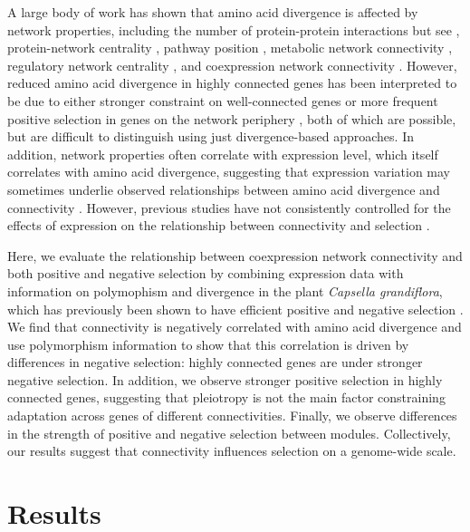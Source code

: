 A large body of work has shown that amino acid divergence is affected by network properties, including the number of protein-protein interactions \citep{Fraser2002-rg,Lemos2005-io,Luisi2015-zz} but see \citep{Hahn2004-ke,Jordan2003-ri}, protein-network centrality \cite{Hahn2005-au}, pathway position \citep{Rausher1999-nk,Ramsay2009-vf,Eanes2011-on}, metabolic network connectivity \citep{Vitkup2006-bo}, regulatory network centrality \citep{Jovelin2009-tu}, and coexpression network connectivity \citep{Jordan2004-vj,Carlson2006-ai}. However, reduced amino acid divergence in highly connected genes has been interpreted to be due to either stronger constraint on well-connected genes \citep{Hahn2005-au,Ramsay2009-vf} or more frequent positive selection in genes on the network periphery \citep{Kim2007-xn,Luisi2015-zz}, both of which are possible, but are difficult to distinguish using just divergence-based approaches. In addition, network properties often correlate with expression level, which itself correlates with amino acid divergence, suggesting that expression variation may sometimes underlie observed relationships between amino acid divergence and connectivity \citep{Drummond2006-pa}. However, previous studies have not consistently controlled for the effects of expression on the relationship between connectivity and selection \citep{Jordan2004-vj,Fraser2002-rg}.

Here, we evaluate the relationship between coexpression network connectivity and both positive and negative selection by combining  expression data with information on polymophism and divergence in the plant \textit{Capsella grandiflora}, which has previously been shown to have efficient positive and negative selection \citep{Williamson2014-tf}. We find that connectivity is negatively correlated with amino acid divergence and use polymorphism information to show that this correlation is driven by differences in negative selection: highly connected genes are under stronger negative selection. In addition, we observe stronger positive selection in highly connected genes, suggesting that pleiotropy is not the main factor constraining adaptation across genes of different connectivities. Finally, we observe differences in the strength of positive and negative selection between modules. Collectively, our results suggest that connectivity influences selection on a genome-wide scale.

\section{Results}

